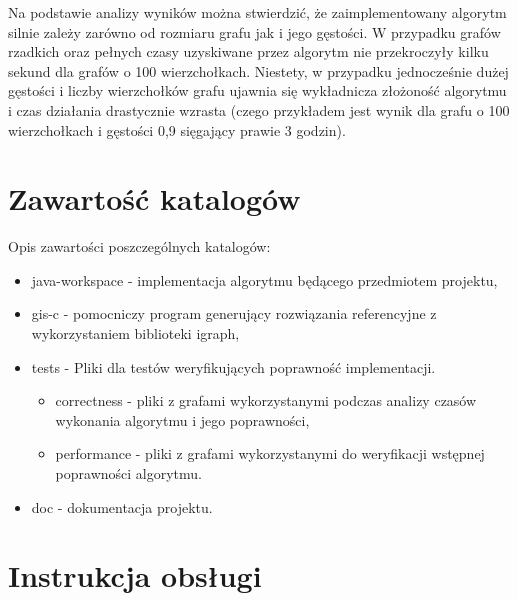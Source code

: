 \documentclass[12pt, a4paper]{article}
\begin{document}
Na podstawie analizy wyników można stwierdzić, że zaimplementowany algorytm silnie zależy zarówno od rozmiaru grafu jak i jego gęstości. W przypadku grafów rzadkich oraz pełnych czasy uzyskiwane przez algorytm nie przekroczyły kilku sekund dla grafów o 100 wierzchołkach. Niestety, w przypadku jednocześnie dużej gęstości i liczby wierzchołków grafu ujawnia się wykładnicza złożoność algorytmu i czas działania drastycznie wzrasta (czego przykładem jest wynik dla grafu o 100 wierzchołkach i gęstości 0,9 sięgający prawie 3 godzin).
\begin{appendices}
\section{Zawartość katalogów}

Opis zawartości poszczególnych katalogów:

\begin{itemize}
 \item java-workspace - implementacja algorytmu będącego przedmiotem projektu,
 \item gis-c - pomocniczy program generujący rozwiązania referencyjne z wykorzystaniem biblioteki igraph,
 \item tests - Pliki dla testów weryfikujących poprawność implementacji.
 	\begin{itemize}
 		\item correctness - pliki z grafami wykorzystanymi podczas analizy czasów wykonania algorytmu i jego poprawności,
 		\item performance - pliki z grafami wykorzystanymi do weryfikacji wstępnej poprawności algorytmu.
 	\end{itemize}
 \item doc - dokumentacja projektu.
\end{itemize}

\section{Instrukcja obsługi}


\end{appendices}
\end{document}
